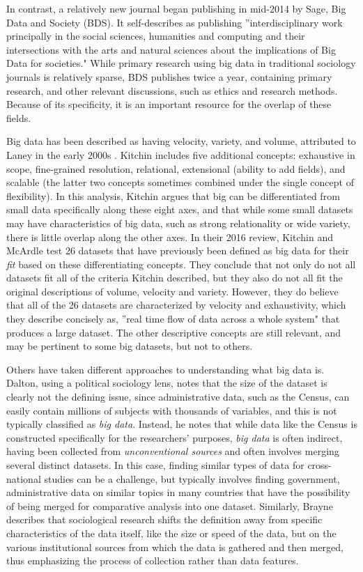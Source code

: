 \documentclass[sigconf]{acmart}
\begin{document}
In contrast, a relatively new journal began publishing in mid-2014 by Sage, Big Data and Society (BDS).  It self-describes as publishing ''interdisciplinary work principally in the social sciences, humanities and computing and their intersections with the arts and natural sciences about the implications of Big Data for societies."  While primary research using big data in traditional sociology journals is relatively sparse, BDS publishes twice a year, containing primary research, and other relevant discussions, such as ethics and research methods.  Because of its specificity, it is an important resource for the overlap of these fields.

Big data has been described as having velocity, variety, and volume, attributed to Laney in the early 2000s \cite{japec15}.  Kitchin \cite{kitchin14} includes five additional concepts: exhaustive in scope, fine-grained resolution, relational, extensional (ability to add fields), and scalable (the latter two concepts sometimes combined under the single concept of flexibility).  In this analysis, Kitchin argues that big can be differentiated from small data specifically along these eight axes, and that while some small datasets may have characteristics of big data, such as strong relationality or wide variety, there is little overlap along the other axes.   In their 2016 review, Kitchin and McArdle \cite{kitchin16} test 26 datasets that have previously been defined as big data for their {\em fit} based on these differentiating concepts.  They conclude that not only do not all datasets fit all of the criteria Kitchin described, but they also do not all fit the original descriptions of volume, velocity and variety.  However, they do believe that all of the 26 datasets are characterized by velocity and exhaustivity, which they describe concisely as, ''real time flow of data across a whole system" that produces a large dataset.  The other descriptive concepts are still relevant, and may be pertinent to some big datasets, but not to others.

Others have taken different approaches to understanding what big data is.  Dalton, using a political sociology lens, \cite{dalton16} notes that the size of the dataset is clearly not the defining issue, since administrative data, such as the Census, can easily contain millions of subjects with thousands of variables, and this is not typically classified as {\em big data}.  Instead, he notes that while data like the Census is constructed specifically for the researchers' purposes, {\em big data} is often indirect, having been collected from {\em unconventional sources} and often involves merging several distinct datasets.  In this case, finding similar types of data for cross-national studies can be a challenge, but typically involves finding government, administrative data on similar topics in many countries that have the possibility of being merged for comparative analysis into one dataset.  Similarly, Brayne \cite {brayne17} describes that sociological research shifts the definition away from specific characteristics of the data itself, like the size or speed of the data, but on the various institutional sources from which the data is gathered and then merged, thus emphasizing the process of collection rather than data features.
\end{document}

